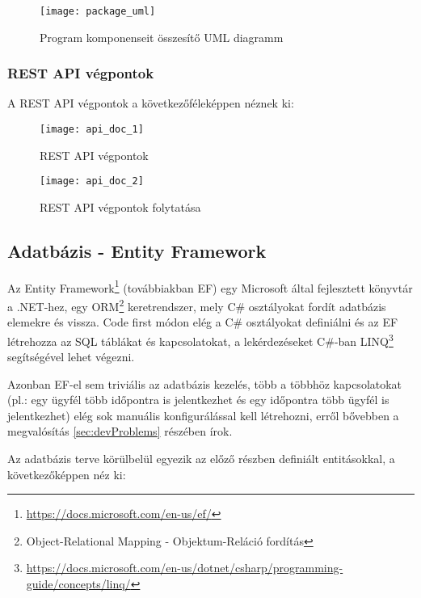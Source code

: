 \begin{figure}[H]
	\centering
	\texttt{[image: package\_uml]}
	\caption{Program komponenseit összesítő UML diagramm}
	\label{fig:package}
\end{figure}


\clearpage

\subsubsection{REST API végpontok}

A REST API végpontok a következőféleképpen néznek ki:

\begin{figure}[H]
	\centering
	\texttt{[image: api\_doc\_1]}
	\caption{REST API végpontok}
	\label{fig:apiDoc1}
\end{figure}

\begin{figure}[H]
	\centering
	\texttt{[image: api\_doc\_2]}
	\caption{REST API végpontok folytatása}
	\label{fig:apiDoc2}
\end{figure}

\subsection{Adatbázis - Entity Framework}
Az Entity Framework\footnote{\url{https://docs.microsoft.com/en-us/ef/}} (továbbiakban EF) egy Microsoft által fejlesztett könyvtár a .NET-hez, egy ORM\footnote{Object-Relational Mapping - Objektum-Reláció fordítás} keretrendszer, mely C\# osztályokat fordít adatbázis elemekre és vissza. Code first módon elég a C\# osztályokat definiálni és az EF létrehozza az SQL táblákat és kapcsolatokat, a lekérdezéseket C\#-ban LINQ\footnote{\url{https://docs.microsoft.com/en-us/dotnet/csharp/programming-guide/concepts/linq/}} segítségével lehet végezni.

Azonban EF-el sem triviális az adatbázis kezelés, több a többhöz kapcsolatokat (pl.: egy ügyfél több időpontra is jelentkezhet és egy időpontra több ügyfél is jelentkezhet) elég sok manuális konfigurálással kell létrehozni, erről bővebben a megvalósítás \ref{sec:devProblems} részében írok.

Az adatbázis terve körülbelül egyezik az előző részben definiált entitásokkal, a következőképpen néz ki:


